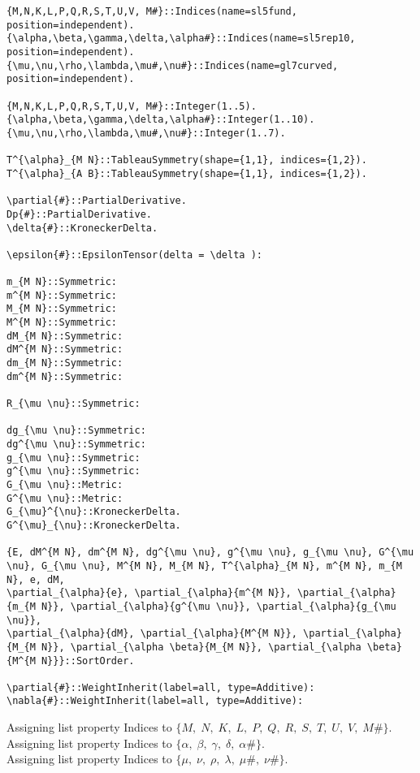 \documentclass[11pt]{article}
\begin{document}
{\color[named]{Blue}\begin{verbatim}
{M,N,K,L,P,Q,R,S,T,U,V, M#}::Indices(name=sl5fund, position=independent).
{\alpha,\beta,\gamma,\delta,\alpha#}::Indices(name=sl5rep10, position=independent).
{\mu,\nu,\rho,\lambda,\mu#,\nu#}::Indices(name=gl7curved, position=independent).

{M,N,K,L,P,Q,R,S,T,U,V, M#}::Integer(1..5).
{\alpha,\beta,\gamma,\delta,\alpha#}::Integer(1..10).
{\mu,\nu,\rho,\lambda,\mu#,\nu#}::Integer(1..7).

T^{\alpha}_{M N}::TableauSymmetry(shape={1,1}, indices={1,2}).
T^{\alpha}_{A B}::TableauSymmetry(shape={1,1}, indices={1,2}).

\partial{#}::PartialDerivative.
Dp{#}::PartialDerivative.
\delta{#}::KroneckerDelta.

\epsilon{#}::EpsilonTensor(delta = \delta ):

m_{M N}::Symmetric:
m^{M N}::Symmetric:
M_{M N}::Symmetric:
M^{M N}::Symmetric:
dM_{M N}::Symmetric:
dM^{M N}::Symmetric:
dm_{M N}::Symmetric:
dm^{M N}::Symmetric:

R_{\mu \nu}::Symmetric:

dg_{\mu \nu}::Symmetric:
dg^{\mu \nu}::Symmetric:
g_{\mu \nu}::Symmetric:
g^{\mu \nu}::Symmetric:
G_{\mu \nu}::Metric:
G^{\mu \nu}::Metric:
G_{\mu}^{\nu}::KroneckerDelta.
G^{\mu}_{\nu}::KroneckerDelta.

{E, dM^{M N}, dm^{M N}, dg^{\mu \nu}, g^{\mu \nu}, g_{\mu \nu}, G^{\mu \nu}, G_{\mu \nu}, M^{M N}, M_{M N}, T^{\alpha}_{M N}, m^{M N}, m_{M N}, e, dM,
\partial_{\alpha}{e}, \partial_{\alpha}{m^{M N}}, \partial_{\alpha}{m_{M N}}, \partial_{\alpha}{g^{\mu \nu}}, \partial_{\alpha}{g_{\mu \nu}},
\partial_{\alpha}{dM}, \partial_{\alpha}{M^{M N}}, \partial_{\alpha}{M_{M N}}, \partial_{\alpha \beta}{M_{M N}}, \partial_{\alpha \beta}{M^{M N}}}::SortOrder.

\partial{#}::WeightInherit(label=all, type=Additive):
\nabla{#}::WeightInherit(label=all, type=Additive):
\end{verbatim}}
Assigning list property Indices to $\{M,\; N,\; K,\; L,\; P,\; Q,\; R,\; S,\; T,\; U,\; V,\; M\#\}$.
\\
Assigning list property Indices to $\{\alpha,\; \beta,\; \gamma,\; \delta,\; \alpha\#\}$.
\\
Assigning list property Indices to $\{\mu,\; \nu,\; \rho,\; \lambda,\; \mu\#,\; \nu\#\}$.
\\
\end{document}
